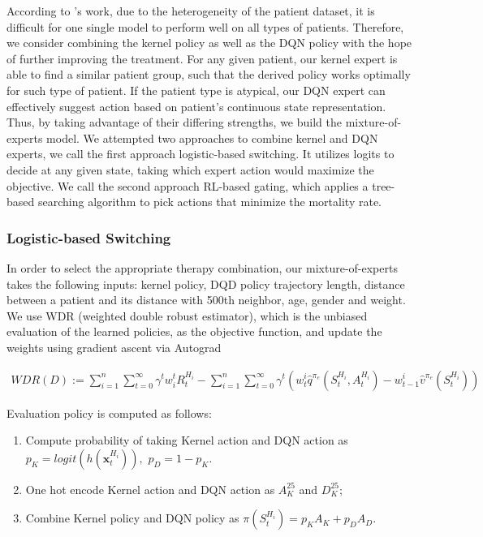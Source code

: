 \documentclass[letterpaper]{article}
\begin{document}
According to \cite{parbhoo2017combining}'s work, due to the heterogeneity of the patient dataset, it is difficult for one single model to perform well on all types of patients. Therefore, we consider combining the kernel policy as well as the DQN policy with the hope of further improving the treatment. For any given patient, our kernel expert is able to find a similar patient group, such that the derived policy works optimally for such type of patient. If the patient type is atypical, our DQN expert can effectively suggest action based on patient's continuous state representation. Thus, by taking advantage of their differing strengths, we build the mixture-of-experts model. We attempted two approaches to combine kernel and DQN experts, we call the first approach logistic-based switching. It utilizes logits to decide at any given state, taking which expert action would maximize the objective. We call the second approach RL-based gating, which applies a tree-based searching algorithm to pick actions that minimize the mortality rate.

\subsubsection{Logistic-based Switching}

In order to select the appropriate therapy combination, our mixture-of-experts takes the following inputs: kernel policy, DQD policy trajectory length, distance between a patient and its distance with 500th neighbor, age, gender and weight. We use WDR (weighted double robust estimator)\cite{thomas2016data}, which is the unbiased evaluation of the learned policies, as the objective function, and update the weights using gradient ascent via Autograd \cite{maclaurin2015autograd}

\begin{align}
\label{func:wdr}
WDR(D) := \sum_{i=1}^n\sum_{t=0}^{\infty} \gamma^tw_i^tR_t^{H_i} -  \sum_{i=1}^n\sum_{t=0}^{\infty}\gamma^t(w_t^i\hat{q}^{\pi_e}(S_t^{H_i}, A_t^{H_i}) - w_{t-1}^i\hat{v}^{\pi_e}(S_t^{H_i}))
\end{align}

Evaluation policy is computed as follows: 
\begin{enumerate}
\item Compute probability of taking Kernel action and DQN action as $p_{K} = logit(h(\mathbf{x}_t^{H_i})),\,\,p_{D} = 1- p_{K}$. 
\item One hot encode Kernel action and DQN action as $A_K^{25}$ and $D_K^{25}$; 
\item Combine Kernel policy and DQN policy as $\pi(S_t^{H_i}) = p_{K}A_K + p_{D}A_D$.
\end{enumerate}
\end{document}
